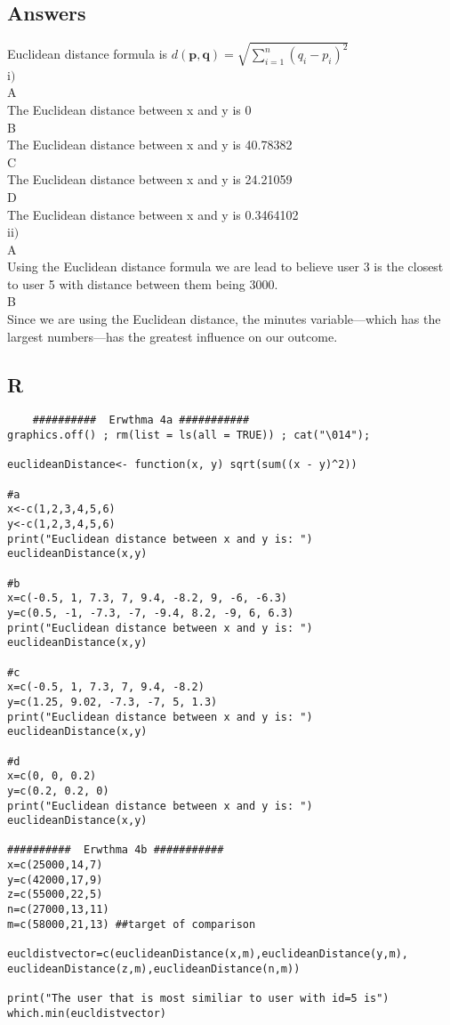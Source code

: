 \documentclass[10pt,towside,a4paper]{article}
\begin{document}
\subsection{Answers}
Euclidean distance formula is $d(\mathbf {p,q})= \sqrt{\sum \limits_{i=1}^n (q_i-p_i)^2}$\\
i$)$\\
A\\
The Euclidean distance between x and y is 0\\
B\\
The Euclidean distance between x and y is 40.78382\\
C\\
The Euclidean distance between x and y is 24.21059\\
D\\
The Euclidean distance between x and y is 0.3464102\\
ii$)$\\
A\\
Using the Euclidean distance formula we are lead to believe user 3 is the closest to user 5 with distance between them being 3000.\\
B\\
Since we are using the Euclidean distance, the minutes variable—which has the largest numbers—has the greatest influence on our outcome.




\subsection{R}

\begin{lstlisting}
	##########  Erwthma 4a ###########
graphics.off() ; rm(list = ls(all = TRUE)) ; cat("\014");
	
euclideanDistance<- function(x, y) sqrt(sum((x - y)^2))
	
#a
x<-c(1,2,3,4,5,6)
y<-c(1,2,3,4,5,6)
print("Euclidean distance between x and y is: ")
euclideanDistance(x,y)
	
#b
x=c(-0.5, 1, 7.3, 7, 9.4, -8.2, 9, -6, -6.3)
y=c(0.5, -1, -7.3, -7, -9.4, 8.2, -9, 6, 6.3)
print("Euclidean distance between x and y is: ")
euclideanDistance(x,y)
	
#c
x=c(-0.5, 1, 7.3, 7, 9.4, -8.2)
y=c(1.25, 9.02, -7.3, -7, 5, 1.3)
print("Euclidean distance between x and y is: ")
euclideanDistance(x,y)
	
#d
x=c(0, 0, 0.2)
y=c(0.2, 0.2, 0)
print("Euclidean distance between x and y is: ")
euclideanDistance(x,y)
	
##########  Erwthma 4b ###########
x=c(25000,14,7)
y=c(42000,17,9)
z=c(55000,22,5)
n=c(27000,13,11)
m=c(58000,21,13) ##target of comparison
	
eucldistvector=c(euclideanDistance(x,m),euclideanDistance(y,m),
euclideanDistance(z,m),euclideanDistance(n,m))

print("The user that is most similiar to user with id=5 is")
which.min(eucldistvector)
	
\end{lstlisting}
\newpage
\end{document}

